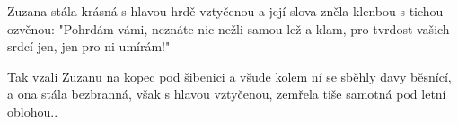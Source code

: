 \beginverse{}
Zuzana stála krásná s hlavou hrdě vztyčenou
a její slova zněla klenbou s tichou ozvěnou:
"Pohrdám vámi, neznáte nic nežli samou lež a klam,
pro tvrdost vašich srdcí jen, jen pro ni umírám!"
\endverse{}

\beginverse{}
Tak vzali Zuzanu na kopec pod šibenici
a všude kolem ní se sběhly davy běsnící,
a ona stála bezbranná, však s hlavou vztyčenou,
zemřela tiše samotná pod letní oblohou..
\endverse{}

\endsong{}
